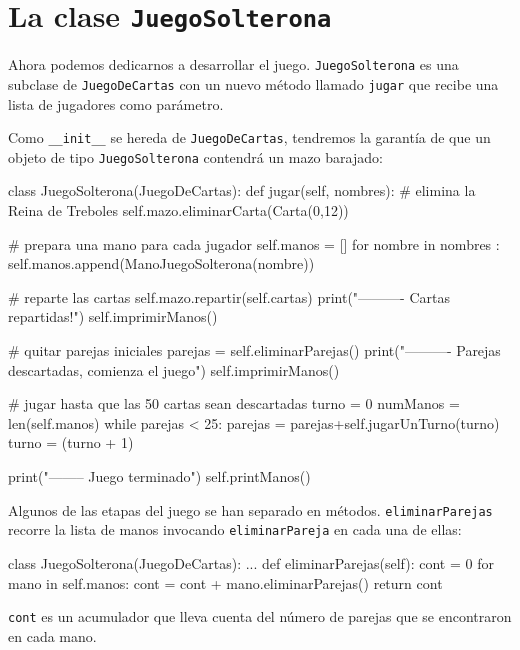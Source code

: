 \section{La clase \texttt{JuegoSolterona}}


Ahora podemos dedicarnos a desarrollar el juego. \texttt{JuegoSolterona}
es una subclase de \texttt{JuegoDeCartas} con un nuevo método llamado
\texttt{jugar} que recibe una lista de jugadores como parámetro.

Como \texttt{\_\_init\_\_} se hereda de \texttt{JuegoDeCartas}, tendremos
la garantía de que un objeto de tipo \texttt{JuegoSolterona} contendrá
un mazo barajado:

\begin{pythoncode}
class JuegoSolterona(JuegoDeCartas):
  def jugar(self, nombres):
    # elimina la Reina de Treboles
    self.mazo.eliminarCarta(Carta(0,12))

    # prepara una mano para cada jugador
    self.manos = []
    for nombre in nombres :
      self.manos.append(ManoJuegoSolterona(nombre))

    # reparte las  cartas
    self.mazo.repartir(self.cartas)
    print("---------- Cartas repartidas!")
    self.imprimirManos()

    # quitar parejas iniciales
    parejas = self.eliminarParejas()
    print("---------- Parejas descartadas, comienza el juego")
    self.imprimirManos()

    # jugar hasta que las 50 cartas sean descartadas
    turno = 0
    numManos = len(self.manos)
    while parejas < 25:
      parejas = parejas+self.jugarUnTurno(turno)
      turno = (turno + 1) %

    print("-------- Juego terminado")
    self.printManos()
\end{pythoncode}
 Algunos de las etapas del juego se han separado en métodos. \texttt{eliminarParejas}
recorre la lista de manos invocando \texttt{eliminarPareja} en cada
una de ellas:
\begin{pythoncode}
class JuegoSolterona(JuegoDeCartas):
  ...
  def eliminarParejas(self):
    cont = 0
    for mano in self.manos:
      cont = cont + mano.eliminarParejas()
    return cont
\end{pythoncode}

\texttt{cont} es un acumulador que lleva cuenta del número de parejas
que se encontraron en cada mano.


